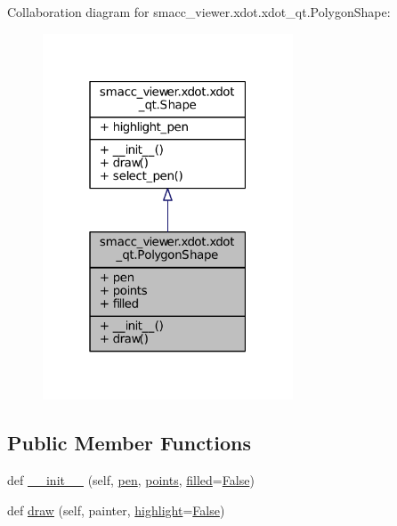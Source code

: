 Collaboration diagram for smacc\+\_\+viewer.\+xdot.\+xdot\+\_\+qt.\+Polygon\+Shape\+:
\nopagebreak
\begin{figure}[H]
\begin{center}
\leavevmode
\includegraphics[width=211pt]{classsmacc__viewer_1_1xdot_1_1xdot__qt_1_1PolygonShape__coll__graph}
\end{center}
\end{figure}
\subsection*{Public Member Functions}
\begin{DoxyCompactItemize}
\item 
def \hyperlink{classsmacc__viewer_1_1xdot_1_1xdot__qt_1_1PolygonShape_a14eb1fbacac08b7b805ee72f677fd2cb}{\+\_\+\+\_\+init\+\_\+\+\_\+} (self, \hyperlink{classsmacc__viewer_1_1xdot_1_1xdot__qt_1_1PolygonShape_a483a5be59c36935b9caa0ac404f398de}{pen}, \hyperlink{classsmacc__viewer_1_1xdot_1_1xdot__qt_1_1PolygonShape_a01107adea1ab0c6fc4c369c32e5f3393}{points}, \hyperlink{classsmacc__viewer_1_1xdot_1_1xdot__qt_1_1PolygonShape_a7e3ac7cdc3243a36dc0068d180673a71}{filled}=\hyperlink{namespacesmacc__viewer_a5928e8da279785cbab9011356c3eaa87}{False})
\item 
def \hyperlink{classsmacc__viewer_1_1xdot_1_1xdot__qt_1_1PolygonShape_a44baa5c301e9c19e075bee254320f47c}{draw} (self, painter, \hyperlink{namespacesmacc__viewer_1_1xdot_1_1xdot__qt_ab7970f10809cac5c23ebf9c6badb6d79}{highlight}=\hyperlink{namespacesmacc__viewer_a5928e8da279785cbab9011356c3eaa87}{False})
\end{DoxyCompactItemize}
